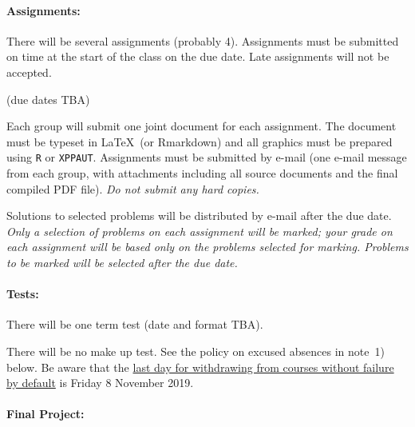 \documentclass[12pt]{article}
\newcommand{\note}{\noindent{\bfseries\slshape Note:\/} }
\begin{document}
\paragraph*{Assignments:} There will be several assignments (probably 4).  Assignments must be submitted on time at the start of the class on the due date.  Late assignments will not be accepted.

(due dates TBA)

\noindent
Each group will submit one joint document for each assignment.  The
document must be typeset in \LaTeX\ (or Rmarkdown) and all graphics must be prepared
using {\tt R} or {\tt XPPAUT}.  Assignments must be submitted by
e-mail (one e-mail message from each group, with attachments including
all source documents and the final compiled PDF file).  \emph{Do not
 submit any hard copies.}

Solutions to selected problems will be distributed by e-mail after the due date.
\note \emph{Only a selection of problems on each assignment will be marked; your grade on each assignment will be based only on the problems selected for marking.  Problems to be marked will be selected after the due date.}



\paragraph*{Tests:}

There will be one term test (date and format TBA).

There will be no make up test. See the policy on excused absences in
note~1) below.  Be aware that the
\href{https://academiccalendars.romcmaster.ca/content.php?catoid=38&navoid=8059}{last
  day for withdrawing from courses without failure by default} is
Friday 8 November 2019.

\paragraph*{Final Project:}
\end{document}
